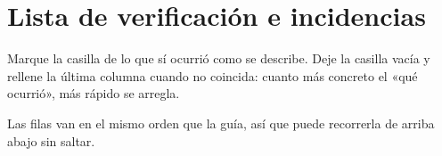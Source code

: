 \documentclass[11pt,a4paper]{article}
\begin{document}
\section{Lista de verificación e incidencias}
\label{sec:incidencias}

Marque la casilla de lo que sí ocurrió como se describe. Deje la casilla vacía y
rellene la última columna cuando no coincida: cuanto más concreto el «qué
ocurrió», más rápido se arregla.

Las filas van en el mismo orden que la guía, así que puede recorrerla de arriba
abajo sin saltar.

\end{document}
